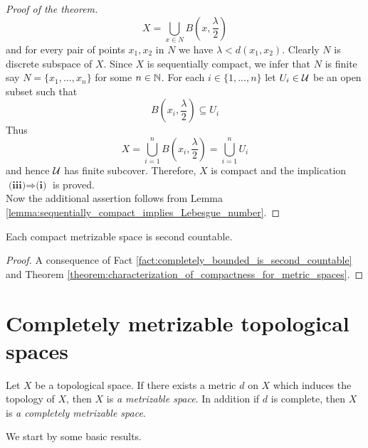 \begin{proof}[Proof of the theorem]
$$X = \bigcup_{x\in N}B\left(x,\frac{\lambda}{2}\right)$$
and for every pair of points $x_1,x_2$ in $N$ we have $\lambda < d(x_1,x_2)$. Clearly $N$ is discrete subspace of $X$. Since $X$ is sequentially compact, we infer that $N$ is finite say $N = \{x_1,...,x_n\}$ for some $n\in {\mathbb N}$. For each $i \in \{1,...,n\}$ let $U_i\in {\mathcal U}$ be an open subset such that 
$$B\left(x_i,\frac{\lambda}{2}\right) \subseteq U_i$$
Thus 
$$X = \bigcup_{i=1}^n B\left(x_i,\frac{\lambda}{2}\right) = \bigcup_{i=1}^nU_i$$
and hence ${\mathcal U}$ has finite subcover. Therefore, $X$ is compact and the implication $\textbf{(iii)}\Rightarrow \textbf{(i)}$ is proved.\\
Now the additional assertion follows from Lemma \ref{lemma:sequentially_compact_implies_Lebesgue_number}.
\end{proof}

\begin{corollary}\label{corollary:each_compact_metrizable_space_is_second_contable}
Each compact metrizable space is second countable.
\end{corollary}
\begin{proof}
A consequence of Fact \ref{fact:completely_bounded_is_second_countable} and Theorem \ref{theorem:characterization_of_compactness_for_metric_spaces}.
\end{proof}

\section{Completely metrizable topological spaces}

\begin{definition}
Let $X$ be a topological space. If there exists a metric $d$ on $X$ which induces the topology of $X$, then $X$ is \textit{a metrizable space}. In addition if $d$ is complete, then $X$ is \textit{a completely metrizable space}.
\end{definition}
\noindent
We start by some basic results.

